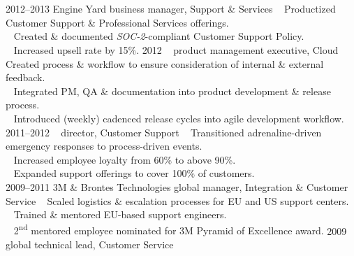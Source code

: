 \documentclass[]{friggeri-cv} %
\begin{document}
\section{{}{} {\normalsize{}}}

\begin{entrylist}
\entry
{2012--2013}
{Engine Yard}
{business manager, Support \& Services}
{{\tiny {}} ~ Productized Customer Support \& Professional Services offerings.\\
{\tiny {}} ~ Created \& documented \emph{SOC-2}-compliant Customer Support Policy.
\\{\tiny {}} ~ Increased upsell rate by 15\%.}
\entry
{2012}
{~}
{product management executive, Cloud}
{{\tiny {}} ~ Created process \& workflow to ensure consideration of internal \& external feedback.\\
{\tiny {}} ~ Integrated PM, QA \& documentation into product development \& release process.\\
{\tiny {}} ~  Introduced (weekly) cadenced release cycles into agile development workflow.}
\entry
{2011--2012}
{~}
{director, Customer Support}
{{\tiny {}} ~ Transitioned adrenaline-driven emergency responses to process-driven events.\\
{\tiny {}} ~ Increased employee loyalty from 60\% to above 90\%.\\
{\tiny {}} ~ Expanded support offerings to cover 100\% of customers.\\
}
\entry
{2009--2011}
{3M \& Brontes Technologies}
{global manager, Integration \& Customer Service}
{{\tiny {}} ~ Scaled logistics \& escalation processes for EU and US support centers.\\
{\tiny {}} ~ Trained \& mentored EU-based support engineers.\\
{\tiny {}} ~ 2\textsuperscript{nd} mentored employee nominated for 3M Pyramid of Excellence award.}
\entry
{2009}
{~}
{global technical lead, Customer Service}

\end{entrylist}
\end{document}
